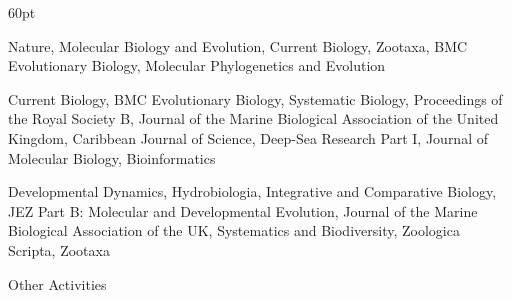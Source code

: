 \begin{entry}{60pt}
\item [\rm 2009] Nature, Molecular Biology and Evolution, Current Biology, Zootaxa, BMC Evolutionary Biology, Molecular Phylogenetics and Evolution
\item [\rm 2008] Current Biology, BMC Evolutionary Biology, Systematic Biology, Proceedings of the Royal Society B, Journal of the Marine Biological Association of the United Kingdom, Caribbean Journal of Science, Deep-Sea Research Part I, Journal of Molecular Biology, Bioinformatics
\item [\rm 2007] Developmental Dynamics, Hydrobiologia, Integrative and Comparative Biology, JEZ Part B: Molecular and Developmental Evolution, Journal of the Marine Biological Association of the UK, Systematics and Biodiversity, Zoologica Scripta, Zootaxa

\end{entry}
Other Activities

